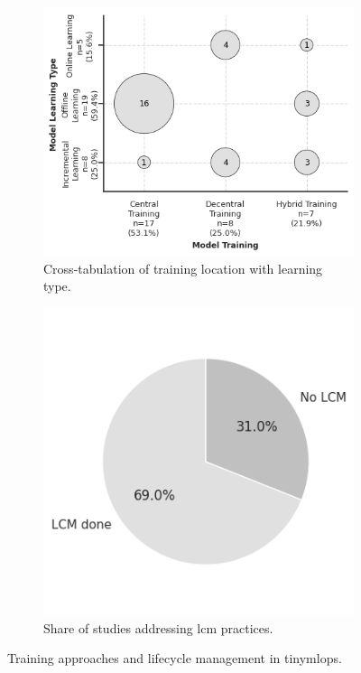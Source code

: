 \begin{figure}[htbp]
    \centering
    \begin{subfigure}{0.62\textwidth}
        \centering
        \includegraphics[width=\textwidth]{figs/research_results/sms-training-ort.png}
        \caption[Model training vs. learning type]{Cross-tabulation of training location with learning type.}
        \label{fig:training-learning}
    \end{subfigure}
    \hfill 
    \begin{subfigure}{0.36\textwidth}
        \centering
        \includegraphics[width=\textwidth]{figs/research_results/lcm-done.png}
        \caption[LCM application in studies]{Share of studies addressing \gls{lcm} practices.}
        \label{fig:lcm-done}
    \end{subfigure}
    \caption{Training approaches and lifecycle management in \gls{tinymlops}.}
    \label{fig:training-learning-vs-lcm}
\end{figure}

